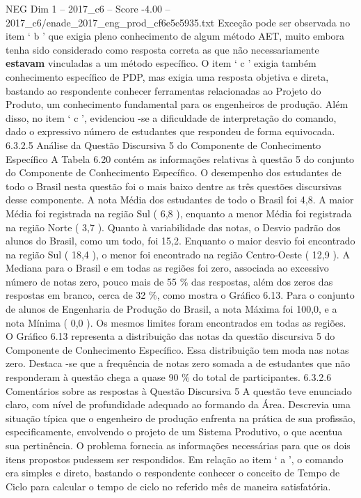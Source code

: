 \begin{textsample}{NEG Dim 1 – 2017\_c6 – Score -4.00 – 2017\_c6/enade\_2017\_eng\_prod\_cf6e5e5935.txt}
Exceção pode ser observada no item ‘ b ’ que exigia pleno conhecimento de algum método AET, muito embora tenha sido considerado como resposta correta as que não necessariamente \textbf{estavam} vinculadas a um método específico.
O item ‘ c ’ exigia também conhecimento específico de PDP, mas exigia uma resposta objetiva e direta, bastando ao respondente conhecer ferramentas relacionadas ao Projeto do Produto, um conhecimento fundamental para os engenheiros de produção.
Além disso, no item ‘ c ’, evidenciou -se a dificuldade de interpretação do comando, dado o expressivo número de estudantes que respondeu de forma equivocada. 6.3.2.5 Análise da Questão Discursiva 5 do Componente de Conhecimento Específico A Tabela 6.20 contém as informações relativas à questão 5 do conjunto do Componente de Conhecimento Específico.
O desempenho dos estudantes de todo o Brasil nesta questão foi o mais baixo dentre as três questões discursivas desse componente.
A nota Média dos estudantes de todo o Brasil foi 4,8.
A maior Média foi registrada na região Sul ( 6,8 ), enquanto a menor Média foi registrada na região Norte ( 3,7 ).
Quanto à variabilidade das notas, o Desvio padrão dos alunos do Brasil, como um todo, foi 15,2.
Enquanto o maior desvio foi encontrado na região Sul ( 18,4 ), o menor foi encontrado na região Centro-Oeste ( 12,9 ).
A Mediana para o Brasil e em todas as regiões foi zero, associada ao excessivo número de notas zero, pouco mais de 55 \% das respostas, além dos zeros das respostas em branco, cerca de 32 \%, como mostra o Gráfico 6.13.
Para o conjunto de alunos de Engenharia de Produção do Brasil, a nota Máxima foi 100,0, e a nota Mínima ( 0,0 ).
Os mesmos limites foram encontrados em todas as regiões.
O Gráfico 6.13 representa a distribuição das notas da questão discursiva 5 do Componente de Conhecimento Específico.
Essa distribuição tem moda nas notas zero.
Destaca -se que a frequência de notas zero somada a de estudantes que não responderam à questão chega a quase 90 \% do total de participantes. 6.3.2.6 Comentários sobre as respostas à Questão Discursiva 5 A questão teve enunciado claro, com nível de profundidade adequado ao formando da Área.
Descrevia uma situação típica que o engenheiro de produção enfrenta na prática de sua profissão, especificamente, envolvendo o projeto de um Sistema Produtivo, o que acentua sua pertinência.
O problema fornecia as informações necessárias para que os dois itens propostos pudessem ser respondidos.
Em relação ao item ‘ a ’, o comando era simples e direto, bastando o respondente conhecer o conceito de Tempo de Ciclo para calcular o tempo de ciclo no referido mês de maneira satisfatória.

\end{textsample}
